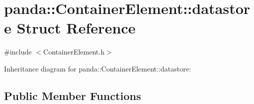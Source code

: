 \hypertarget{structpanda_1_1ContainerElement_1_1datastore}{\section{panda\-:\-:Container\-Element\-:\-:datastore Struct Reference}
\label{structpanda_1_1ContainerElement_1_1datastore}
}


{\ttfamily \#include $<$Container\-Element.\-h$>$}



Inheritance diagram for panda\-:\-:Container\-Element\-:\-:datastore\-:
\subsection*{Public Member Functions}
